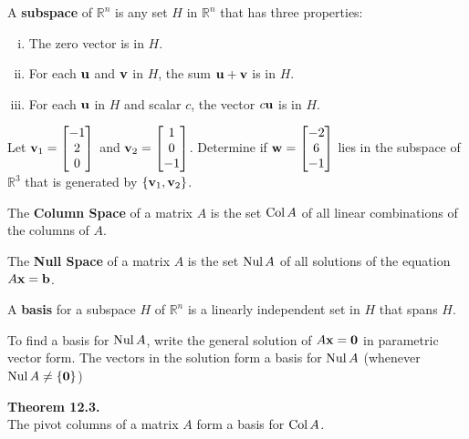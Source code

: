 \begin{boxdef}
A {\bf subspace} of $\mathbb{R}^n$ is any set $H$ in $\mathbb{R}^n$ that has three properties:
\begin{enumerate}[(i)]
	\item The zero vector is in $H$.
	\item For each $\boldsymbol{\mathbf{u}}$ and $\boldsymbol{\mathbf{v}}$ in $H$, the sum $\boldsymbol{\mathbf{u}}+\boldsymbol{\mathbf{v}}$ is in $H$.
	\item For each $\boldsymbol{\mathbf{u}}$ in $H$ and scalar $c$, the vector $c\boldsymbol{\mathbf{u}}$ is in $H$.
\end{enumerate}
\end{boxdef}

\begin{exercise}

Let $\boldsymbol{\mathbf{v}}_1 = \begin{bmatrix}-1\\2\\0\end{bmatrix}$ and $\boldsymbol{\mathbf{v}}_2 = \begin{bmatrix} 1\\0\\-1\end{bmatrix}$. Determine if $\boldsymbol{\mathbf{w}} = \begin{bmatrix}-2\\6\\-1\end{bmatrix}$ lies in the subspace of $\mathbb{R}^3$ that is generated by $\{ \boldsymbol{\mathbf{v}}_1,\boldsymbol{\mathbf{v}}_2 \}$.
\end{exercise}

\vfill

\begin{boxdef}
The {\bf Column Space} of a matrix $A$ is the set $\operatorname{Col} A$ of all linear combinations of the columns of $A$.
\end{boxdef}

\begin{boxdef}
The {\bf Null Space} of a matrix $A$ is the set $\operatorname{Nul} A$ of all solutions of the equation $A\boldsymbol{\mathbf{x}}=\boldsymbol{\mathbf{b}}$.
\end{boxdef}


\begin{boxdef}
A {\bf basis} for a subspace $H$ of $\mathbb{R}^n$ is a linearly independent set in $H$ that spans $H$.
\end{boxdef}



\begin{boxme}
	To find a basis for $\operatorname{Nul} A$, write the general solution of $A\boldsymbol{\mathbf{x}}=\boldsymbol{\mathbf{0}}$ in parametric vector form. The vectors in the solution form a basis for $\operatorname{Nul} A$ (whenever $\operatorname{Nul} A \neq \{\boldsymbol{\mathbf{0}}\}$)
\end{boxme}
\begin{boxthm}
	\textbf{Theorem 12.3.} \\
	The pivot columns of a matrix $A$ form a basis for $\operatorname{Col} A$.
\end{boxthm}

